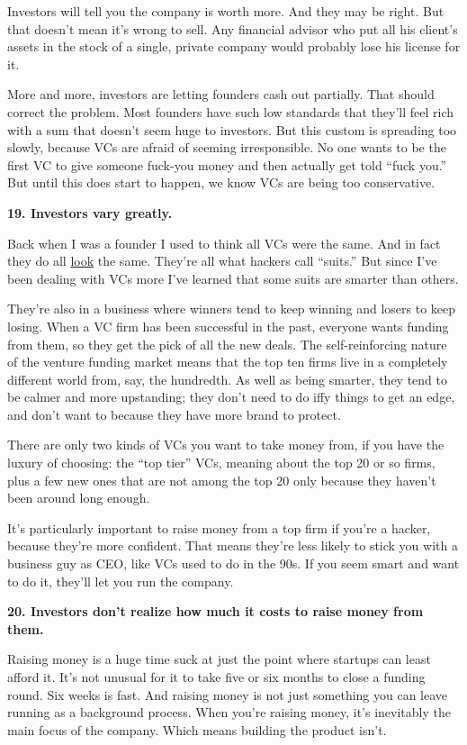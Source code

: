 Investors will tell you the company is worth more. And they may be
right. But that doesn't mean it's wrong to sell. Any financial advisor
who put all his client's assets in the stock of a single, private
company would probably lose his license for it.

More and more, investors are letting founders cash out partially. That
should correct the problem. Most founders have such low standards that
they'll feel rich with a sum that doesn't seem huge to investors. But
this custom is spreading too slowly, because VCs are afraid of seeming
irresponsible. No one wants to be the first VC to give someone fuck-you
money and then actually get told ``fuck you.'' But until this does start
to happen, we know VCs are being too conservative.

\textbf{19. Investors vary greatly.}

Back when I was a founder I used to think all VCs were the same. And in
fact they do all \href{http://www.redpoint.com/team/}{look} the same.
They're all what hackers call ``suits.'' But since I've been dealing
with VCs more I've learned that some suits are smarter than others.

They're also in a business where winners tend to keep winning and losers
to keep losing. When a VC firm has been successful in the past, everyone
wants funding from them, so they get the pick of all the new deals. The
self-reinforcing nature of the venture funding market means that the top
ten firms live in a completely different world from, say, the hundredth.
As well as being smarter, they tend to be calmer and more upstanding;
they don't need to do iffy things to get an edge, and don't want to
because they have more brand to protect.

There are only two kinds of VCs you want to take money from, if you have
the luxury of choosing: the ``top tier'' VCs, meaning about the top 20
or so firms, plus a few new ones that are not among the top 20 only
because they haven't been around long enough.

It's particularly important to raise money from a top firm if you're a
hacker, because they're more confident. That means they're less likely
to stick you with a business guy as CEO, like VCs used to do in the 90s.
If you seem smart and want to do it, they'll let you run the company.

\textbf{20. Investors don't realize how much it costs to raise money
from them.}

Raising money is a huge time suck at just the point where startups can
least afford it. It's not unusual for it to take five or six months to
close a funding round. Six weeks is fast. And raising money is not just
something you can leave running as a background process. When you're
raising money, it's inevitably the main focus of the company. Which
means building the product isn't.

